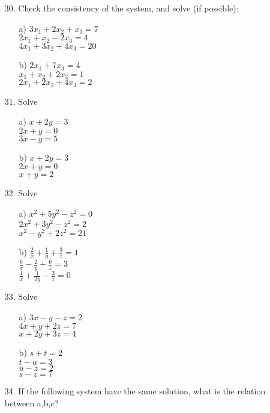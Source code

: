 \documentclass[12pt,a4paper]{article}
\begin{document}
    \begin{enumerate}
        \item [30.] Check the consistency of the system, and solve (if possible):
            \begin{enumerate}
                \item [a)] 
                    $3x_1 + 2x_2 + x_3=7$\\
                    $2x_1+x_2-2x_3=4$\\
                    $4x_1+3x_2+4x_3=20 $
                \item[b)] 
                    $2x_1+7x_3=4$\\
                    $x_1+x_2+2x_3=1$ \\ 
                    $2x_1+2x_2+4x_3=2$
            \end{enumerate}
        \item [31.] Solve
            \begin{enumerate}
                \item [a)] 
                    $x+2y = 3$\\ 
                    $2x+y=0$\\ 
                    $3x-y=5$
                \item[b)] 
                    $x+2y=3$\\
                    $2x+y=0$ \\ 
                    $x+y=2$
            \end{enumerate}
        \item [32.] Solve
            \begin{enumerate}
                \item [a)] 
                    $x^2+5y^2-z^2=0$\\ 
                    $2x^2+3y^2-z^2=2$\\ 
                    $x^2-y^2+2z^2=21 $
                \item[b)] 
                    $\frac{2}{x}+\frac{1}{y}+\frac{3}{z}=1$\\
                    $\frac{6}{x}-\frac{2}{y}+\frac{6}{z}=3$ \\ $\frac{1}{x}+\frac{1}{2y}-\frac{3}{z}=0$
            \end{enumerate}
        \item [33.] Solve
            \begin{enumerate}
                \item [a)] 
                    $3x-y-z=2$\\ 
                    $4x+y+2z=7$\\ 
                    $x+2y+3z=4$
                \item[b)] 
                    $s+t=2$\\
                    $t-u=3$ \\ 
                    $u-z=2$\\
                    $s-z=7$
            \end{enumerate}
        \item [34.] If the following system have the same solution, what is the relation between a,b,c?
            

\end{enumerate}
\end{document}
